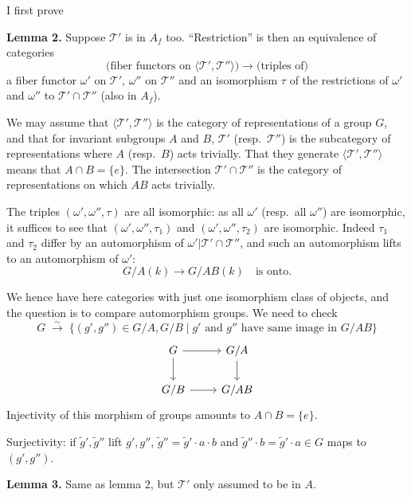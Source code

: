 \documentclass[11pt,a4paper]{article}
\theoremstyle{plain}
\theoremstyle{definition}
\begin{document}
\medskip
\noindent I first prove

\medskip
\noindent\textbf{Lemma 2.} Suppose $\mathcal{T}'$ is in $A_f$ too.
``Restriction'' is then an equivalence of categories
\[
\text{(fiber functors on } \langle \mathcal{T}', \mathcal{T}'' \rangle \text{)}
\longrightarrow
\text{(triples of)}
\]
a fiber functor $\omega'$ on $\mathcal{T}'$, $\omega''$ on $\mathcal{T}''$ and an
isomorphism $\tau$ of the restrictions of $\omega'$ and $\omega''$ to
$\mathcal{T}' \cap \mathcal{T}''$ (also in $A_f$).

\medskip

We may assume that $\langle \mathcal{T}', \mathcal{T}'' \rangle$ is the category
of representations of a group $G$, and that for invariant subgroups $A$ and $B$,
$\mathcal{T}'$ (resp.~$\mathcal{T}''$) is the subcategory of representations
where $A$ (resp.~$B$) acts trivially. That they generate
$\langle \mathcal{T}', \mathcal{T}'' \rangle$ means that
$A \cap B = \{e\}$. The intersection $\mathcal{T}' \cap \mathcal{T}''$ is the
category of representations on which $AB$ acts trivially.

The triples $(\omega', \omega'', \tau)$ are all isomorphic: as all $\omega'$
(resp.~all $\omega''$) are isomorphic, it suffices to see that
$(\omega', \omega'', \tau_1)$ and $(\omega', \omega'', \tau_2)$ are isomorphic.
Indeed $\tau_1$ and $\tau_2$ differ by an automorphism of
$\omega'|\mathcal{T}' \cap \mathcal{T}''$, and such an automorphism lifts to
an automorphism of $\omega'$:
\[
G/A(k) \longrightarrow G/AB(k) \quad \text{is onto.}
\]

We hence have here categories with just one isomorphism class of objects, and
the question is to compare automorphism groups. We need to check
\[
G \;\xrightarrow{\sim}\; \{(g', g'') \in G/A, G/B \mid g' \text{ and } g''
\text{ have same image in } G/AB\}
\]
\[
\begin{tikzcd}
G \arrow[r] \arrow[d] & G/A \arrow[d] \\
G/B \arrow[r] & G/AB
\end{tikzcd}
\]
Injectivity of this morphism of groups amounts to $A \cap B = \{e\}$.

Surjectivity: if $\tilde{g}', \tilde{g}''$ lift $g', g''$,
$\tilde{g}'' = \tilde{g}' \cdot a \cdot b$ and
$\tilde{g}'' \cdot b = \tilde{g}' \cdot a \in G$ maps to $(g', g'')$.

\medskip
\noindent\textbf{Lemma 3.} Same as lemma 2, but $\mathcal{T}'$ only assumed to
be in $A$.

\medskip
\end{document}
